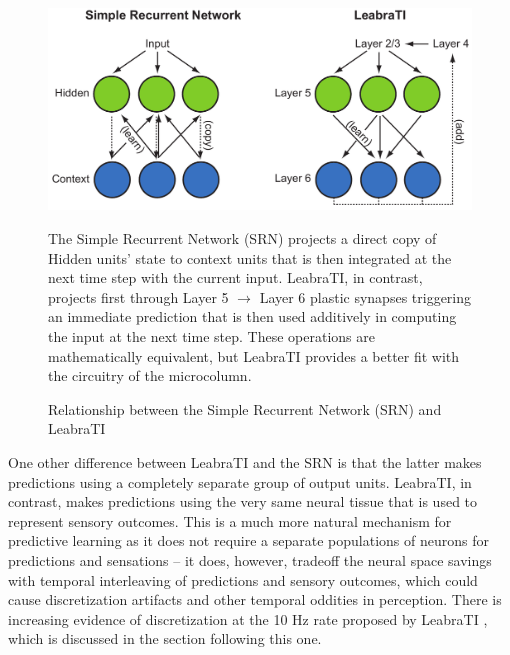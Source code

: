 \documentclass[dwyatte_dissertation.tex]{subfiles}
\begin{document}
\begin{figure}[h!]
\begin{center}
\includegraphics[width=140mm]{figs/chap_leabrati/srn_invert.pdf}
\end{center}
\caption{Relationship between the Simple Recurrent Network (SRN) and LeabraTI}{The Simple Recurrent Network (SRN) projects a direct copy of Hidden units' state to context units that is then integrated at the next time step with the current input. LeabraTI, in contrast, projects first through Layer 5 $\rightarrow$ Layer 6 plastic synapses triggering an immediate prediction that is then used additively in computing the input at the next time step. These operations are mathematically equivalent, but LeabraTI provides a better fit with the circuitry of the microcolumn.}
\label{fig:srn_invert}
\end{figure}

One other difference between LeabraTI and the SRN is that the latter makes predictions using a completely separate group of output units. LeabraTI, in contrast, makes predictions using the very same neural tissue that is used to represent sensory outcomes. This is a much more natural mechanism for predictive learning as it does not require a separate populations of neurons for predictions and sensations -- it does, however, tradeoff the neural space savings with temporal interleaving of predictions and sensory outcomes, which could cause discretization artifacts and other temporal oddities in perception. There is increasing evidence of discretization at the 10 Hz rate proposed by LeabraTI \cite{VanRullenKoch03b,VanRullenDubois11,VanRullenBuschDrewesEtAl11}, which is discussed in the section following this one. 

\end{document}
